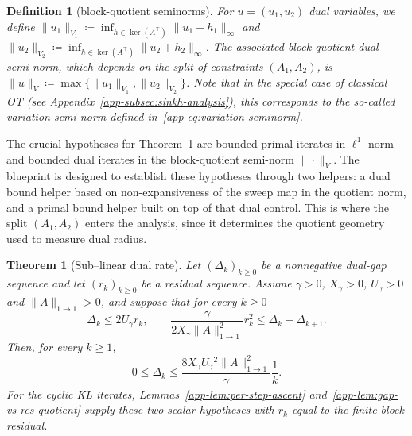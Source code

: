 \documentclass{article}
\theoremstyle{plain}
\newtheorem{theorem}{Theorem}[section]
\newtheorem{definition}{Definition}[section]
\newcommand{\eqdef}{\coloneqq}
\newcommand{\Umax}{U_\gamma}
\newcommand{\Xmax}{X_\gamma}
\begin{document}
\begin{definition}[block-quotient seminorms]\label{def:block-seminorm} For $u=(u_1,u_2)$ dual variables, we define $\|u_1\|_{V_1}\eqdef\inf_{h\in\ker(A^\top)}\|u_1+h_1\|_\infty$ and $\|u_2\|_{V_2}\eqdef\inf_{h\in\ker(A^\top)}\|u_2+h_2\|_\infty$. The associated block-quotient dual semi-norm, which depends on the split of constraints $(A_1,A_2)$, is $\|u\|_V\eqdef\max\{\|u_1\|_{V_1},\|u_2\|_{V_2}\}$. Note that in the special case of classical OT (see Appendix~\ref{app-subsec:sinkh-analysis}), this corresponds to the so-called variation semi-norm defined in~\eqref{app-eq:variation-seminorm}.
\end{definition}


The crucial hypotheses for Theorem~\ref{thm:kl-dual-rate} are bounded primal iterates in $\ell^1$ norm and bounded dual iterates in the block-quotient semi-norm $\|\cdot\|_V$. The blueprint is designed to establish these hypotheses through two helpers: a dual bound helper based on non-expansiveness of the sweep map in the quotient norm, and a primal bound helper built on top of that dual control. This is where the split $(A_1,A_2)$ enters the analysis, since it determines the quotient geometry used to measure dual radius.

\begin{theorem}[Sub--linear dual rate]
\label{thm:kl-dual-rate}
Let $(\Delta_k)_{k\ge0}$ be a nonnegative dual-gap sequence and let $(r_k)_{k\ge0}$ be a residual sequence.
Assume $\gamma>0$, $\Xmax>0$, $\Umax>0$ and $\|A\|_{1\to1}>0$, and suppose that for every $k\ge0$
\[
  \Delta_k\le 2\Umax r_k,
  \qquad
  \frac{\gamma}{2\Xmax\|A\|_{1\to1}^2}r_k^2
  \le
  \Delta_k-\Delta_{k+1}.
\]
Then, for every $k\ge1$,
\begin{equation}\label{eq:dual-rate-new}
  0 \le \Delta_k
   \le 
  \frac{8 \Xmax{} \Umax{}^{2} \|A\|_{1\to1}^{2}}{\gamma} \frac{1}{k}.
\end{equation}
For the cyclic KL iterates, Lemmas~\ref{app-lem:per-step-ascent} and~\ref{app-lem:gap-vs-res-quotient} supply these two scalar hypotheses with $r_k$ equal to the finite block residual.
\end{theorem}
\end{document}
